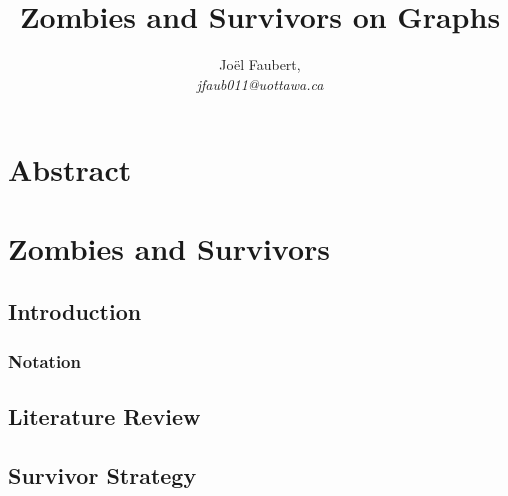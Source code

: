 \documentclass[letterpaper, 12pt]{report}
\title{Zombies and Survivors on Graphs}
\author{Jo\"el Faubert, \\ \textit{jfaub011@uottawa.ca}}
\theoremstyle{definition}
\begin{document}

\hypersetup{pageanchor=false}


\hypersetup{pageanchor=true}


\chapter*{Abstract}


\tableofcontents

\cleardoublepage{}

\chapter{Zombies and Survivors}
\section{Introduction}


\subsection{Notation}


\section{Literature Review}


%

%

\section{Survivor Strategy}


% 
\end{document}
